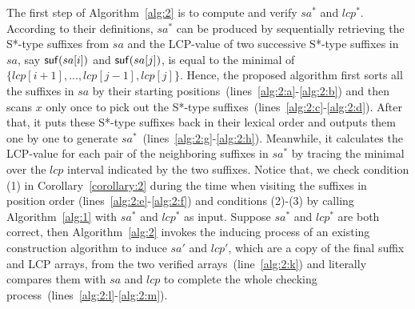 \documentclass[10pt,journal,compsoc]{IEEEtran}
\begin{document}
The first step of Algorithm~\ref{alg:2} is to compute and verify $sa^*$ and $lcp^*$. According to their definitions, $sa^*$ can be produced by sequentially retrieving the S*-type suffixes from $sa$ and the LCP-value of two successive S*-type suffixes in $sa$, say ${\sf suf}(sa[i])$ and ${\sf suf}(sa[j])$, is equal to the minimal of $\{lcp[i + 1], ..., lcp[j - 1], lcp[j]\}$. Hence, the proposed algorithm first sorts all the suffixes in $sa$ by their starting positions~(lines~\ref{alg:2:a}-\ref{alg:2:b}) and then scans $x$ only once to pick out the S*-type suffixes~(lines~\ref{alg:2:c}-\ref{alg:2:d}). After that, it puts these S*-type suffixes back in their lexical order and outputs them one by one to generate $sa^*$~(lines~\ref{alg:2:g}-\ref{alg:2:h}). Meanwhile, it calculates the LCP-value for each pair of the neighboring suffixes in $sa^*$ by tracing the minimal over the $lcp$ interval indicated by the two suffixes. Notice that, we check condition (1) in Corollary~\ref{corollary:2} during the time when visiting the suffixes in position order (lines~\ref{alg:2:e}-\ref{alg:2:f}) and conditions (2)-(3) by calling Algorithm~\ref{alg:1} with $sa^*$ and $lcp^*$ as input. Suppose $sa^*$ and $lcp^*$ are both correct, then Algorithm~\ref{alg:2} invokes the inducing process of an existing construction algorithm to induce $sa'$ and $lcp'$, which are a copy of the final suffix and LCP arrays, from the two verified arrays~(line~\ref{alg:2:k}) and literally compares them with $sa$ and $lcp$ to complete the whole checking process~(lines~\ref{alg:2:l}-\ref{alg:2:m}).
\end{document}
